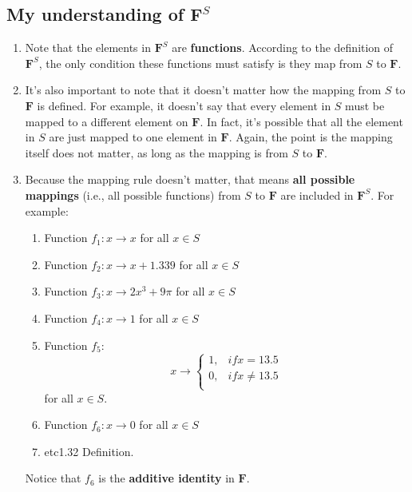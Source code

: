 \documentclass[12pt, letterpaper, oneside]{book}
\begin{document}
\subsection{My understanding of $\mathbf{F}^S$} \label{F^S understanding}

\begin{enumerate}
  \item Note that the elements in $\mathbf{F}^S$ are \textbf{functions}.
    According to the definition of $\mathbf{F}^S$, the only condition these
    functions must satisfy is they map from $S$ to $\mathbf{F}$.
  \item It's also important to note that it doesn't matter how the mapping from
    $S$ to $\mathbf{F}$ is defined. For example, it doesn't say that every
    element in $S$ must be mapped to a different element on $\mathbf{F}$. In
    fact, it's possible that all the element in $S$ are just mapped to one
    element in $\mathbf{F}$. Again, the point is the mapping itself does not
    matter, as long as the mapping is from $S$ to $\mathbf{F}$.
  \item \label{mapping rules} Because the mapping rule doesn't matter, that
    means \textbf{all possible mappings} (i.e., all possible functions) from
    $S$ to $\mathbf{F}$ are included in $\mathbf{F}^S$. For example:
    \begin{enumerate}
      \item Function $f_1: x \rightarrow x$ for all $x \in S$
      \item Function $f_2: x \rightarrow x + 1.339$ for all $x \in S$
      \item Function $f_3: x \rightarrow 2x^3 + 9\pi$ for all $x \in S$
      \item Function $f_4: x \rightarrow 1$ for all $x \in S$
      \item Function $f_5:$
        \[
          x \rightarrow \begin{cases}
            1, & if x = 13.5 \\
            0,  & if x \neq 13.5 \\
          \end{cases}
        \]
        for all $x \in S$.
      \item Function $f_6: x \rightarrow 0$ for all $x \in S$
      \item etc1.32 Definition.
    \end{enumerate}
    Notice that $f_6$ is the \textbf{additive identity} in $\mathbf{F}$.

\end{enumerate}
\end{document}
